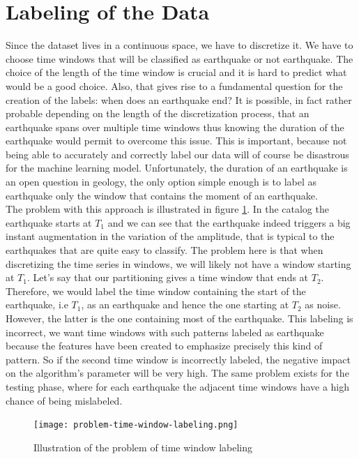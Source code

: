 \documentclass[10pt,conference,compsocconf]{IEEEtran}
\begin{document}
\section{Labeling of the Data}
\label{section:labeling}
Since the dataset lives in a continuous space, we have to discretize it. We have to choose time windows that will be classified as earthquake or not earthquake. The choice of the length of the time window is crucial and it is hard to predict what would be a good choice. Also, that gives rise to a fundamental question for the creation of the labels: when does an earthquake end? It is possible, in fact rather probable depending on the length of the discretization process, that an earthquake spans over multiple time windows thus knowing the duration of the earthquake would permit to overcome this issue. This is important, because not being able to accurately and correctly label our data will of course be disastrous for the machine learning model. Unfortunately, the duration of an earthquake is an open question in geology, the only option simple enough is to label as earthquake only the window that contains the moment of an earthquake.\\
The problem with this approach is illustrated in figure \ref{fig:problem-discretization}. In the catalog the earthquake starts at $T_1$ and we can see that the earthquake indeed triggers a big instant augmentation in the variation of the amplitude, that is typical to the earthquakes that are quite easy to classify. The problem here is that when discretizing the time series in windows, we will likely not have a window starting at $T_1$. Let's say that our partitioning gives a time window that ends at $T_2$. Therefore, we would label the time window containing the start of the earthquake, i.e $T_1$, as an earthquake and hence the one starting at $T_2$ as noise. However, the latter is the one containing most of the earthquake. This labeling is incorrect, we want time windows with such patterns labeled as earthquake because the features have been created to emphasize precisely this kind of pattern. So if the second time window is incorrectly labeled, the negative impact on the algorithm's parameter will be very high. The same problem exists for the testing phase, where for each earthquake the adjacent time windows have a high chance of being mislabeled.

\begin{figure}[h]
  \centering
	\texttt{[image: problem-time-window-labeling.png]}
  \caption{Illustration of the problem of time window labeling}
	\label{fig:problem-discretization}
\end{figure}
\end{document}

